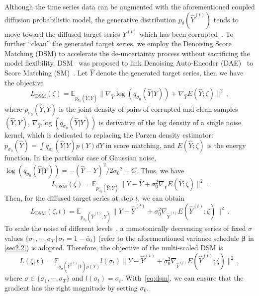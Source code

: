 Although the time series data can be augmented with the aforementioned coupled diffusion probabilistic model, the generative distribution $ p_{\theta}(\widehat{Y}^{(t)}) $ tends to move toward the diffused target series $ Y^{(t)} $ which has been corrupted~\cite{li2019learning, song2019generative}. 
To further ``clean'' the generated target series, we employ the Denoising Score Matching (DSM) to accelerate the de-uncertainty process without sacrificing the model flexibility. 
DSM~\cite{vincent2011connection,li2019learning} was proposed to link Denoising Auto-Encoder (DAE)~\cite{vincent2010stacked} to Score Matching  (SM)~\cite{hyvarinen2009estimation}.
Let $ \widehat{Y} $ denote the generated target series, then we have the objective 
\begin{equation}
    L_{\text{DSM}}(\zeta) = \mathbb{E}_{ p_{\sigma_0} (\widehat{Y}, Y)} 
    \| \nabla_{\widehat{Y}} \log(q_{\sigma_0} (\widehat{Y}|Y)) + \nabla_{\widehat{Y}} E(\widehat{Y}; \zeta) \|^{2} \, ,
\end{equation}
where $p_{\sigma_0} (\widehat{Y}, Y)$ is the joint density of pairs of corrupted and clean samples $(\widehat{Y}, Y)$, 
$ \nabla_{\widehat{Y}} \log(q_{\sigma_0} (\widehat{Y}|Y)) $ is derivative of the log density of a single noise kernel, which is dedicated to replacing the Parzen density estimator: $ p_{\sigma_0} (\widehat{Y}) = \int q_{\sigma_0} (\widehat{Y}|Y) p(Y) dY$ in score matching, 
and $E(\widehat{Y}; \zeta)$ is the energy function. 
In the particular case of Gaussian noise, 
$\log(q_{\sigma_0} (\widehat{Y}|Y)) = - (\widehat{Y} - Y)^2/2 {\sigma_0}^2 + C$. 
Thus, we have 
\begin{equation}
    L_{\text{DSM}}(\zeta) = \mathbb{E}_{p_{\sigma_0}(\widehat{Y}, Y)} \| Y - \widehat{Y} + \sigma_0^2 \nabla_{\widehat{Y}} E(\widehat{Y}; \zeta) \|^{2} \, .
\end{equation}
Then, for the diffused target series at step $t$, we can obtain 
\begin{equation}
    L_{\text{DSM}}(\zeta, t) = \mathbb{E}_{p_{\sigma_0} (\widehat{Y}^{(t)}, Y)} \| Y - \widehat{Y}^{(t)} + \sigma_0^2 \nabla_{\widehat{Y}^{(t)}} E(\widehat{Y}^{(t)}; \zeta) \|^2 \, .
\end{equation}
To scale the noise of different levels~\cite{li2019learning}, a monotonically decreasing series of fixed $\sigma$ values $ \{ \sigma_1, \cdots, \sigma_T \,|\, \sigma_t = 1-\bar{\alpha}_t \}$ (refer to the aforementioned variance schedule $\bm{\beta}$ in \cref{sec2.2}) is adopted.
Therefore, the objective of the multi-scaled DSM is 
\begin{equation}    \label{eq:dsm}
    L(\zeta,t) = \mathbb{E}_{q_{\sigma}(\widehat{Y}^{(t)}|Y)p(Y)} 
    l(\sigma_t) 
    \| Y - \widehat{Y}^{(t)} + \sigma_0^2 \nabla_{\widehat{Y}^{(t)}} 
    E(\widehat{Y}^{(t)}; \zeta) \|^2
    \, ,
\end{equation}
where $ \sigma \in \{ \sigma_1, \cdots, \sigma_T \} $ and $l(\sigma_t) = \sigma_t$. 
With~\cref{eq:dsm}, we can ensure that the gradient has the right magnitude by setting $\sigma_0$.

